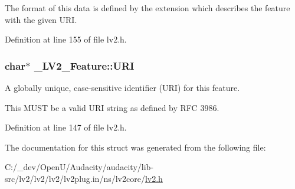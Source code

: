 The format of this data is defined by the extension which describes the feature with the given {\ttfamily U\+RI}. 

Definition at line 155 of file lv2.\+h.

\subsubsection[{\texorpdfstring{U\+RI}{URI}}]{ char$\ast$ \+\_\+\+L\+V2\+\_\+\+Feature\+::\+U\+RI}\hypertarget{struct___l_v2___feature_a9ac77cf6137eb6fc6bc33456fceb4b4c}{}\label{struct___l_v2___feature_a9ac77cf6137eb6fc6bc33456fceb4b4c}
A globally unique, case-\/sensitive identifier (U\+RI) for this feature.

This M\+U\+ST be a valid U\+RI string as defined by R\+FC 3986. 

Definition at line 147 of file lv2.\+h.



The documentation for this struct was generated from the following file\+:\begin{DoxyCompactItemize}
\item 
C\+:/\+\_\+dev/\+Open\+U/\+Audacity/audacity/lib-\/src/lv2/lv2/lv2/lv2plug.\+in/ns/lv2core/\hyperlink{lv2_8h}{lv2.\+h}\end{DoxyCompactItemize}
